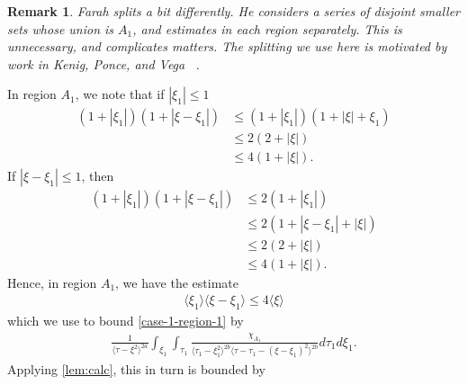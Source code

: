 \documentclass[12pt,reqno]{amsart}
\numberwithin{equation}{section}  %
\newtheorem{remark}[theorem]{Remark}
\begin{document}
%
%
\begin{framed}
\begin{remark}
Farah splits a bit differently. He considers a series of disjoint smaller sets
whose union is $A_{1}$, and estimates in each region separately.  This is
unnecessary, and complicates matters. The splitting we use here is motivated by
work in Kenig, Ponce, and Vega~\cite{Kenig:1996aa}
\label{rem:farah-dif-splitting-organization}.
\end{remark}
\end{framed}
%
In region $A_{1}$, we note that if $| \xi_{1} | \le 1$
%
%
%
%
\begin{equation*}
\begin{split}
  (1 + | \xi_{1} |)(1 + | \xi - \xi_{1} |)
  & \le (1 + | \xi_{1} |)(1 + | \xi | + \xi_{1})
  \\
  & \le 2 (2 + | \xi |)
  \\
  & \le 4 (1 + | \xi |).
\end{split}
\end{equation*}
%
%
If $| \xi - \xi_{1} |\le 1$, then
%
%
\begin{equation*}
\begin{split}
  (1 + | \xi_{1} |)(1 + | \xi - \xi_{1} |)
  & \le 2 (1 + | \xi_{1} |)
  \\
  & \le 2 (1 + | \xi - \xi_{1} | + | \xi |)
  \\
  & \le 2(2 + | \xi |)
  \\
  & \le 4 (1 + | \xi |).
\end{split}
\end{equation*}
%
%
Hence, in region $A_{1}$, we have the estimate
%
%
\begin{equation}
\begin{split}
  \langle \xi_{1} \rangle \langle \xi - \xi_{1} \rangle  \le 4 \langle \xi \rangle 
\end{split}
\label{splitting-estimate}
\end{equation}
%
%
which we use to bound \eqref{case-1-region-1} by
%
%
%
%
\begin{equation*}
\begin{split}
    \frac{ 1}{\langle \tau - \xi^{2} \rangle ^{2a}}
    \int_{\xi_{1}} \int_{\tau_{1}} \frac{\chi_{A_{1}}}{  
    \langle \tau_{1} - \xi_{1}^{2} \rangle^{2b} \langle  \tau - \tau_{1} -
    (\xi - \xi_{1})^{2} \rangle^{2b} }
    d \tau_1 d \xi_{1}.
\end{split}
\end{equation*}
%
%
Applying \cref{lem:calc}, this in turn is bounded by
%
%
\end{document}
